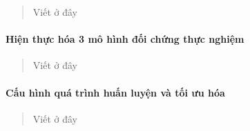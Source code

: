 \documentclass[
]{article}
\begin{document}
\begin{quote}
Viết ở đây
\end{quote}

\hypertarget{hiux1ec7n-thux1ef1c-huxf3a-3-muxf4-huxecnh-ux111ux1ed1i-chux1ee9ng-thux1ef1c-nghiux1ec7m}{%
\paragraph{Hiện thực hóa 3 mô hình đối chứng thực
nghiệm}\label{hiux1ec7n-thux1ef1c-huxf3a-3-muxf4-huxecnh-ux111ux1ed1i-chux1ee9ng-thux1ef1c-nghiux1ec7m}}

\begin{quote}
Viết ở đây
\end{quote}

\hypertarget{cux1ea5u-huxecnh-quuxe1-truxecnh-huux1ea5n-luyux1ec7n-vuxe0-tux1ed1i-ux1b0u-huxf3a}{%
\paragraph{Cấu hình quá trình huấn luyện và tối ưu
hóa}\label{cux1ea5u-huxecnh-quuxe1-truxecnh-huux1ea5n-luyux1ec7n-vuxe0-tux1ed1i-ux1b0u-huxf3a}}

\begin{quote}
Viết ở đây
\end{quote}
\end{document}
